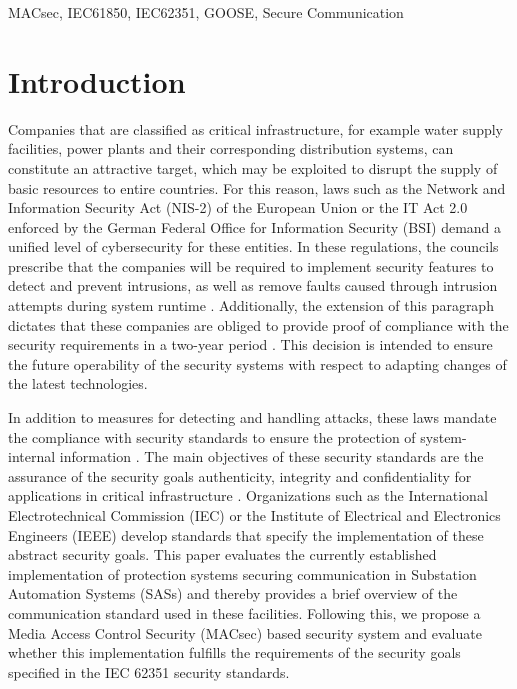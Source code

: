 \documentclass[conference, onecolumn, a4paper]{IEEEtran}
\begin{document}
\vspace{6 pt}

\begin{IEEEkeywords}
    MACsec, IEC61850, IEC62351, GOOSE, Secure Communication
\end{IEEEkeywords}

\section{Introduction}
\label{chapter:introduction}
\noindent Companies that are classified as critical infrastructure, for example water supply facilities, power plants and their corresponding 
distribution systems, can constitute an attractive target, which may be exploited to disrupt the supply of basic resources to entire countries. For this reason, 
laws such as the Network and Information Security Act (NIS-2) \cite{NIS-2:2022} of the European Union or the IT Act 2.0 \cite{IT-Gesetz_2:2021} enforced by the German Federal Office for Information Security (BSI) demand a unified level of cybersecurity for these entities. In these regulations, the councils 
prescribe that the companies will be required to implement security features to detect and prevent intrusions, as well as remove faults caused through 
intrusion attempts during system runtime \cite[§11 (1d)]{IT-Gesetz_2:2021}. Additionally, the extension of this paragraph dictates that these companies 
are obliged to provide proof of compliance with the security requirements in a two-year period \cite[§11 (1e)]{IT-Gesetz_2:2021}. This decision is intended 
to ensure the future operability of the security systems with respect to adapting changes of the latest technologies. 

\smallskip
In addition to measures for detecting and handling attacks, these laws mandate the compliance with security standards to ensure the protection of system-internal information \cite[§2 (2a)]{IT-Gesetz_2:2021}. The main objectives of these security standards are the assurance of the security goals authenticity, integrity 
and confidentiality for applications in critical infrastructure \cite[§2 (13)]{IT-Gesetz_2:2021}. Organizations such as the International 
Electrotechnical Commission (IEC) or the Institute of Electrical and Electronics Engineers (IEEE) develop standards that specify the implementation of these 
abstract security goals. This paper evaluates the currently established implementation of protection systems securing communication in Substation Automation 
Systems (SASs) and thereby provides a brief overview of the communication standard used in these facilities. Following this, we propose a Media Access Control 
Security (MACsec) based security system and evaluate whether this implementation fulfills the requirements of the security goals specified in the IEC 62351 
security standards. 
\end{document}
